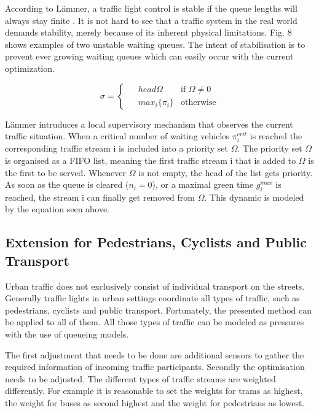 According to L\"ammer, a traffic light control is stable if the queue lengths will always stay finite \cite{laemmer08}. It is not hard to see that a traffic system in the real world demands stability, merely because of its inherent physical limitations. Fig. 8 shows examples of two unstable waiting queues. The intent of stabilisation is to prevent ever growing waiting queues which can easily occur with the current optimization. 

\[
\sigma  = 
\begin{cases}
\phantom{-}head \Omega & \text{if } \Omega \neq 0\\
\phantom{-}max_{i}\{\pi_{i}\} & \text{otherwise}
\end{cases}
\]

L\"ammer intruduces a local supervisory mechanism that observes the current traffic situation. When a critical number of waiting vehicles $\pi_{i}^{crit}$ is reached the corresponding traffic stream i is included into a priority set $\Omega$. The priority set $\Omega$ is organised as a FIFO list, meaning the first traffic stream i that is added to $\Omega$ is the first to be served. Whenever $\Omega$ is not empty, the head of the list gets priority. As soon as the queue is cleared ($n_i = 0$), or a maximal green time $g_{i}^{max}$ is reached, the stream i can finally get removed from $\Omega$. This dynamic is modeled by the equation seen above.

\subsection{Extension for Pedestrians, Cyclists and Public Transport}
Urban traffic does not exclusively consist of individual transport on the streets. Generally traffic lights in urban settings coordinate all types of traffic, such as pedestrians, cyclists and public transport. Fortunately, the presented method can be applied to all of them. All those types of traffic can be modeled as pressures with the use of queueing models.

The first adjustment that needs to be done are additional sensors to gather the required information of incoming traffic participants. Secondly the optimisation needs to be adjusted. The different types of traffic streams are weighted differently. For example it is reasonable to set the weights for trams as highest, the weight for buses as second highest and the weight for pedestrians as lowest.

